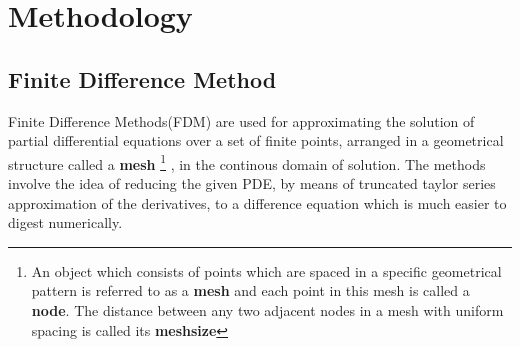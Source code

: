 \section{Methodology}
\subsection{Finite Difference Method}
Finite Difference Methods(FDM) are used for approximating the solution of partial differential equations over a set of finite points, arranged in a geometrical structure called a \textbf{mesh}%
\footnote[1]{An object which consists of points which are spaced in a specific geometrical pattern is referred to as a \textbf{mesh} and each point in this mesh is called a \textbf{node}. The distance between any two adjacent nodes in a mesh with uniform spacing is called its \textbf{meshsize}}%
, in the continous domain of solution. The methods involve the idea of reducing the given PDE, by means of truncated taylor series approximation of the derivatives, to a difference equation which is much easier to digest numerically. 
